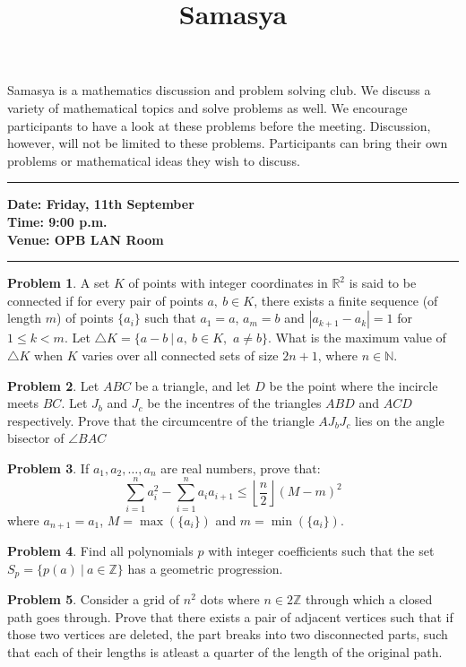 \documentclass[10pt,a4paper,notitlepage]{article}
\title{\textrm{\textbf{\fontsize{30}{40}\selectfont Samasya}}}
\date{%
    }
\theoremstyle{definition}
\newtheorem{prob}{Problem}
\begin{document}
\maketitle

Samasya is a mathematics discussion and problem solving club.
We discuss a variety of mathematical topics and solve problems as well.
We encourage participants to have a look at these problems%
before the meeting.
Discussion, however, will not be limited to these problems.
Participants can bring their own problems or mathematical ideas they wish to discuss.\\
\hrule

\textbf{Date: Friday, 11th September}%
\\
\textbf{Time: 9:00 p.m.}%
\\
\textbf{Venue: OPB LAN Room}%
\\
\hrule


\begin{prob}
A set $K$ of points with integer coordinates in $\mathbb{R}^2$ is said to be connected if for every pair of
points $a,\ b \in K$, there exists a finite sequence (of length $m$) of points $\{a_i\}$ such that $a_1=a$, $a_m=b$ and $|a_{k+1}-a_k|=1$ for $1\leq k < m$. Let $\bigtriangleup K = \{a-b\ |\ a,\ b \in K$,\ $a \neq b\}$. What is the maximum value of $\bigtriangleup K$ when $K$ varies over all connected sets of size $2n+1$, where $n \in \mathbb{N}$.
\end{prob}

\begin{prob}
Let $ABC$ be a triangle, and let $D$ be the point where the incircle meets $BC$. Let $J_b$ and $J_c$ be the incentres of the triangles $ABD$ and $ACD$ respectively. Prove that the circumcentre of the triangle $AJ_bJ_c$ lies on the angle bisector of $\angle BAC$
\end{prob}

\begin{prob}
If $a_1, a_2, \ldots, a_n$ are real numbers, prove that:
$$\sum_{i=1}^n a_i^2 - \sum_{i=1}^n a_ia_{i+1} \leq \left\lfloor \frac{n}{2} \right\rfloor (M-m)^2$$
where $a_{n+1}=a_1$, $M = \max(\{a_i\})$ and $m=\min(\{a_i\})$.
\end{prob}

\begin{prob}
Find all polynomials $p$ with integer coefficients such that the set $S_p = \{p(a)\ |\ a \in \mathbb{Z}\}$ has a geometric progression.
\end{prob}

\begin{prob}
Consider a grid of $n^2$ dots where $n \in 2\mathbb{Z}$ through which a closed path goes through. Prove that there exists a pair of adjacent vertices such that if those two vertices are deleted, the part breaks into two disconnected parts, such that each of their lengths is atleast a quarter of the length of the original path.
\end{prob}
\end{document}
